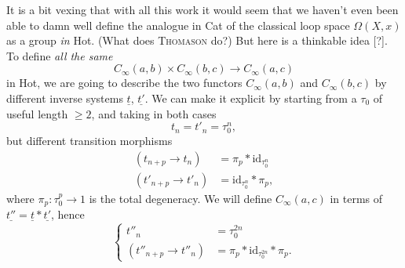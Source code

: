 It is a bit vexing that with all this work it would seem that we haven't even been able to damn well define the analogue in Cat of the classical loop space $\Omega(X, x)$ as a group \textit{in} Hot. (What does \textsc{Thomason} do?) But here is a thinkable idea [?]. To define \textit{all the same}
\[
C_\infty(a,b) \times C_\infty(b,c) \longrightarrow C_\infty(a,c)
\]
in Hot, we are going to describe the two functors $C_\infty(a,b)$ and $C_\infty(b,c)$ by different inverse systems $\underline{t}$, $\underline{t'}$. We can make it explicit by starting from a $\tau_0$ of useful length $\geq 2$, and taking in both cases
\[
t_n = t'_n = \tau_0^n,
\]
but different transition morphisms
\[
\begin{aligned}
(t_{n+p} \longrightarrow t_n) &= \pi_p * \mathrm{id}_{\tau_0^n} \\
(t'_{n+p} \longrightarrow t'_n) &= \mathrm{id}_{\tau_0^n} * \pi_p,
\end{aligned}
\]
where $\pi_p : \tau_0^p \longrightarrow 1$ is the total degeneracy. We will define $C_\infty(a,c)$ in terms of $\underline{t''} = \underline{t} * \underline{t'}$, hence
\[
\left\{
\begin{aligned}
t''_n &= \tau_0^{2n} \\
(t''_{n+p} \longrightarrow t''_n) &= \pi_p * \mathrm{id}_{\tau_0^{2n}} * \pi_p.
\end{aligned}
\right.
\]
